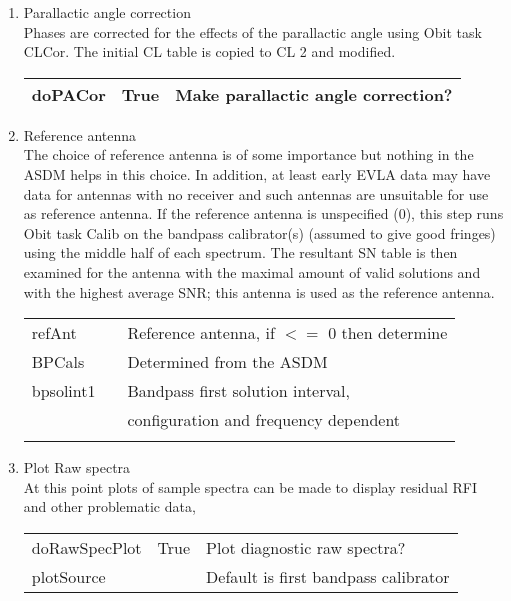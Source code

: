 \documentclass[11pt]{article}
\begin{document}
\begin{enumerate}
\begin{center}
\begin{tabular}{|l|c|l|}
\hline
\end{tabular}
\end{center}
%
\item Parallactic angle correction\\
Phases are corrected for the effects of the parallactic angle using
Obit task CLCor.
The initial CL table is copied to CL 2 and modified.
\begin{center}
\begin{tabular}{|l|c|l|}
\hline
 doPACor & True &  Make parallactic angle correction?\\
\hline
\end{tabular}
\end{center}
%
%
\item Reference antenna\\
The choice of reference antenna is of some importance but nothing in
the ASDM helps in this choice.
In addition, at least early EVLA data may have data for antennas with
no receiver and such antennas are unsuitable for use as reference
antenna.
If the reference antenna is unspecified (0),
this step runs Obit task Calib on the bandpass calibrator(s) (assumed to
give good fringes) using the middle half of each spectrum.
The resultant SN table is then examined for the antenna with the
maximal amount of valid solutions and with the highest average SNR;
this antenna is used as the reference antenna.
\begin{center}
\begin{tabular}{|l|c|l|}
\hline
refAnt  &  & Reference antenna, if $<=$ 0 then determine \\
 BPCals &  & Determined from the ASDM \\
 bpsolint1 &  &  Bandpass first solution interval, \\
 & & configuration and  frequency dependent\\
  &  &  \\
\hline
\end{tabular}
\end{center}
%
\item Plot Raw spectra\\
At this point plots of sample spectra can be made to display residual
RFI and other problematic data,
\begin{center}
\begin{tabular}{|l|c|l|}
\hline
doRawSpecPlot  & True &  Plot diagnostic raw spectra?\\
plotSource     & & Default is first bandpass calibrator\\

\end{tabular}
\end{center}
\end{enumerate}
\end{document}
